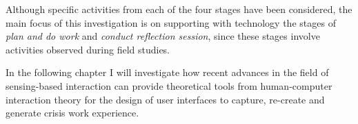 Although specific activities from each of the four stages have been considered, the main focus of this investigation is on supporting with technology the stages of \emph{plan and do work} and \emph{conduct reflection session}, since these stages involve activities observed during field studies.



In the following chapter I will investigate how recent advances in the field of sensing-based interaction can provide theoretical tools from human-computer interaction theory for the design of user interfaces to capture, re-create and generate crisis work experience. 
